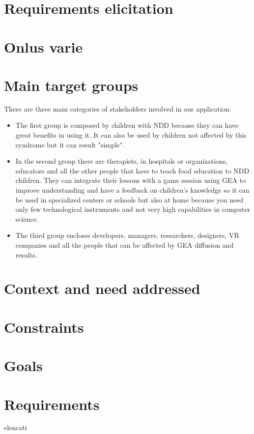 \section{Requirements elicitation}
\section{Onlus varie}
\section{Main target groups}
There are three main categories of stakeholders involved in our application:
\begin{itemize}
\item The first group is composed by children with NDD because they can have great benefits in using it. It can also be used by children not affected by this syndrome but it can result "simple".
\item In the second group there are therapists, in hospitals or organizations, educators and all the other people that have to teach food education to NDD children. They can integrate their lessons with a game session using GEA to improve understanding and have a feedback on children's knowledge so it can be used in specialized centers or schools but also at home because you need only few technological instruments and not very high capabilities in computer science.
\item The third group encloses developers, managers, researchers, designers, VR companies and all the people that can be affected by GEA diffusion and results.
\end{itemize} 
\section{Context and need addressed}
\section{Constraints}
\section{Goals}
\section{Requirements}
elencati